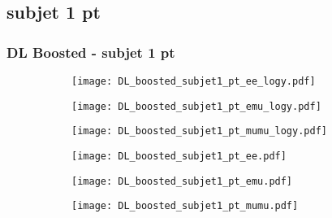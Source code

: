 \documentclass[aspectratio=169,8pt]{beamer}
\begin{document}
\subsection{subjet 1 pt}
\begin{frame}
\frametitle{DL Boosted - subjet 1 pt}
\begin{figure}
\captionsetup[subfigure]{labelformat=empty}
\begin{subfigure}{0.32\textwidth}
\texttt{[image: DL\_boosted\_subjet1\_pt\_ee\_logy.pdf]}
\vspace*{-0.15cm}
\end{subfigure}
\hfil
\begin{subfigure}{0.32\textwidth}
\texttt{[image: DL\_boosted\_subjet1\_pt\_emu\_logy.pdf]}
\vspace*{-0.15cm}
\end{subfigure}
\hfil
\begin{subfigure}{0.32\textwidth}
\texttt{[image: DL\_boosted\_subjet1\_pt\_mumu\_logy.pdf]}
\vspace*{-0.15cm}
\end{subfigure}
\hfil
\begin{subfigure}{0.32\textwidth}
\texttt{[image: DL\_boosted\_subjet1\_pt\_ee.pdf]}
\vspace*{-0.15cm}
\end{subfigure}
\hfil
\begin{subfigure}{0.32\textwidth}
\texttt{[image: DL\_boosted\_subjet1\_pt\_emu.pdf]}
\vspace*{-0.15cm}
\end{subfigure}
\hfil
\begin{subfigure}{0.32\textwidth}
\texttt{[image: DL\_boosted\_subjet1\_pt\_mumu.pdf]}
\vspace*{-0.15cm}
\end{subfigure}
\hfil
\end{figure}
\end{frame}
\newpage
\end{document}
